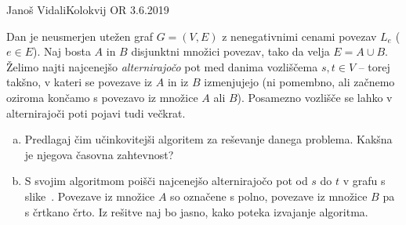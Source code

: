 \begin{naloga}{Janoš Vidali}{Kolokvij OR 3.6.2019}
\begin{vprasanje}
Dan je neusmerjen utežen graf $G = (V, E)$
z nenegativnimi cenami povezav $L_e$ ($e \in E$).
Naj bosta $A$ in $B$ disjunktni množici povezav, tako da velja $E = A \cup B$.
Želimo najti najcenejšo {\em alternirajočo} pot
med danima vozliščema $s, t \in V$
-- torej takšno, v kateri se povezave iz $A$ in iz $B$ izmenjujejo
(ni pomembno, ali začnemo oziroma končamo s povezavo iz množice $A$ ali $B$).
Posamezno vozlišče se lahko v alternirajoči poti pojavi tudi večkrat.

\begin{enumerate}[(a)]
\item Predlagaj čim učinkovitejši algoritem za reševanje danega problema.
Kakšna je njegova časovna zahtevnost?

\item S svojim algoritmom poišči najcenejšo alternirajočo pot od $s$ do $t$
v grafu s slike~\fig.
Povezave iz množice $A$ so označene s polno,
povezave iz množice $B$ pa s črtkano črto.
Iz rešitve naj bo jasno, kako poteka izvajanje algoritma.
\end{enumerate}
%
\begin{slika}
\makebox[\textwidth][c]{
\pgfslika
}
\end{slika}
\end{vprasanje}


\end{naloga}

